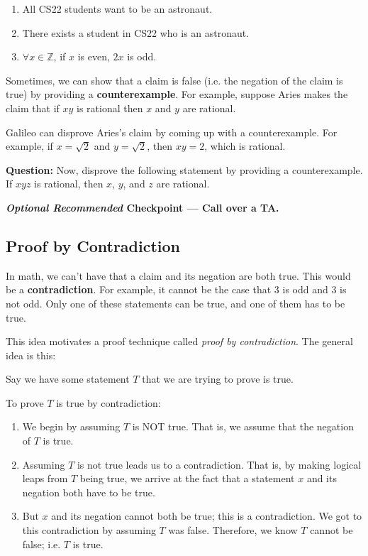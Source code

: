 \documentclass[12pt,letterpaper]{article}
\newcommand\Z{\mathbb Z}
\begin{document}
     \begin{enumerate}
        \item All CS22 students want to be an astronaut.
        \item There exists a student in CS22 who is an astronaut.
        \item $\forall x \in \Z$, if $x$ is even, $2x$ is odd.
      \end{enumerate}
      
      \begin{mdframed} \vspace{1.5cm} \end{mdframed}
      
      Sometimes, we can show that a claim is false (i.e. the negation of the claim is true) by providing a \textbf{counterexample}. For example, suppose Aries makes the claim that if $xy$ is rational then $x$ and $y$ are rational.

      Galileo can disprove Aries's claim by coming up with a counterexample. For example, if $x = \sqrt{2}$ and $y = \sqrt{2}$, then $xy = 2$, which is rational. 

      \textbf{Question:} Now, disprove the following statement by providing a counterexample.
      If $xyz$ is rational, then $x$, $y$, and $z$ are rational.

    \begin{mdframed} \vspace{1cm} \end{mdframed}

\textbf{\textit{Optional Recommended} Checkpoint — Call over a TA.}

      \subsection*{Proof by Contradiction}

      In math, we can't have that a claim and its negation are both true. This would be a \textbf{contradiction}. For example, it cannot be the case that $3$ is odd and $3$ is not odd. Only one of these statements can be true, and one of them has to be true.

      This idea motivates a proof technique called \textit{proof by contradiction}. The general idea is this:

      Say we have some statement $T$ that we are trying to prove is true.

      To prove $T$ is true by contradiction: 
      \begin{enumerate}
        \item We begin by assuming $T$ is NOT true. That is, we assume that the negation of $T$ is true. 
        \item Assuming $T$ is not true leads us to a contradiction. That is, by making logical leaps from $T$ being true, we arrive at the fact that a statement $x$ and its negation both have to be true.
        \item But $x$ and its negation cannot both be true; this is a contradiction. We got to this contradiction by assuming $T$ was false. Therefore, we know $T$ cannot be false; i.e. $T$ is true.
      \end{enumerate}
\end{document}
